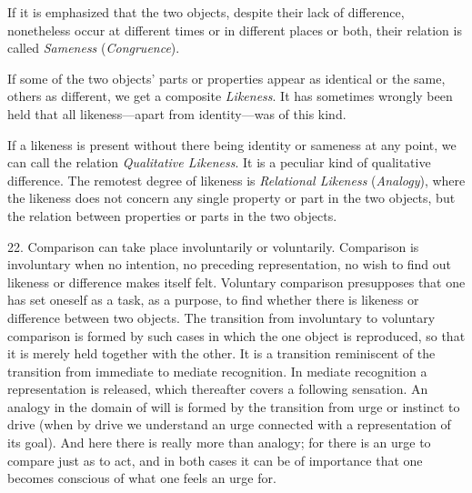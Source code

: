 \documentclass[12pt,a4paper]{book}
\newcommand{\opage}[1]{\marginnote{\footnotesize\textit{[#1]}}}
\begin{document}
If it is emphasized that the two objects, despite their lack of
difference, nonetheless occur at different times or in different places or
both, their relation is called \emph{Sameness} (\emph{Congruence}).

If some of the two objects' parts or properties appear as identical or the
same, others as different, we get a composite \emph{Likeness}. It has
sometimes wrongly been held that all likeness---apart from
identity---was of this kind.

If a likeness is present without there being identity or sameness at any
point, we can call the relation \emph{Qualitative Likeness}. It is a
peculiar kind of qualitative difference. The remotest degree of likeness
is \emph{Relational Likeness} (\emph{Analogy}), where the likeness does
not concern any single property or part in the two objects, but the
relation between properties or parts in the two objects.

22. Comparison can take place involuntarily or voluntarily. Comparison is
involuntary when no intention, no preceding representation, no wish to find
out likeness or difference makes itself felt. Voluntary comparison
presupposes that one has set oneself as a task, as a purpose, to find
whether there is likeness or difference between two objects. The transition
from involuntary to voluntary comparison is formed by such cases in which
the one object is reproduced, so that it is merely held together with the
other. It is a transition reminiscent of the transition from immediate to
mediate recognition. In mediate recognition a representation is released,
which thereafter covers a following sensation. An analogy in the domain of
will is formed by the transition from urge or instinct to drive (when by
drive we understand an urge connected with a representation of its goal).
And here there is really more than analogy; for there is an urge to compare
just as to \opage{66}act, and in both cases it can be of importance that one becomes
conscious of what one feels an urge for.
\end{document}
